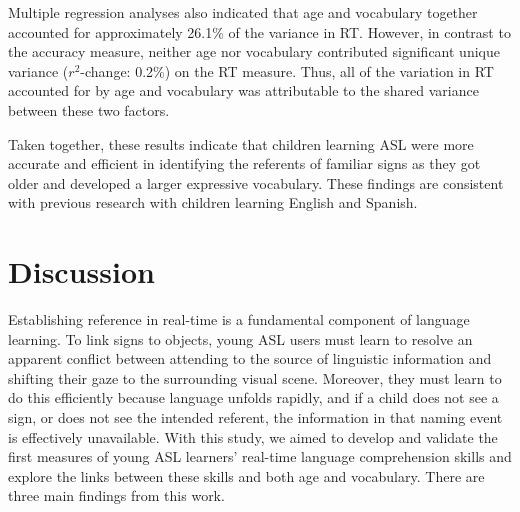 \documentclass[12pt,]{article}
\begin{document}
Multiple regression analyses also indicated that age and vocabulary
together accounted for approximately 26.1\% of the variance in RT.
However, in contrast to the accuracy measure, neither age nor vocabulary
contributed significant unique variance (\(r^2\)-change: 0.2\%) on the
RT measure. Thus, all of the variation in RT accounted for by age and
vocabulary was attributable to the shared variance between these two
factors.

Taken together, these results indicate that children learning ASL were
more accurate and efficient in identifying the referents of familiar
signs as they got older and developed a larger expressive vocabulary.
These findings are consistent with previous research with children
learning English and Spanish.

\section{Discussion}\label{discussion}

Establishing reference in real-time is a fundamental component of
language learning. To link signs to objects, young ASL users must learn
to resolve an apparent conflict between attending to the source of
linguistic information and shifting their gaze to the surrounding visual
scene. Moreover, they must learn to do this efficiently because language
unfolds rapidly, and if a child does not see a sign, or does not see the
intended referent, the information in that naming event is effectively
unavailable. With this study, we aimed to develop and validate the first
measures of young ASL learners' real-time language comprehension skills
and explore the links between these skills and both age and vocabulary.
There are three main findings from this work.
\end{document}
